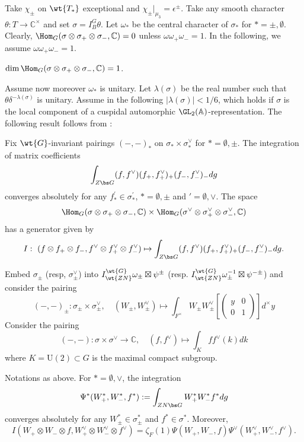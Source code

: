 \documentclass[11pt,reqno]{amsart}
\newcommand{\BA}{{\mathbb {A}}} \newcommand{\BB}{{\mathbb {B}}}
\newcommand{\BC}{{\mathbb {C}}} \newcommand{\BD}{{\mathbb {D}}}
\newcommand{\RU}{{\mathrm {U}}} \newcommand{\RV}{{\mathrm {V}}}
\newcommand{\lra}{\longrightarrow}\newcommand{\lla}{\longleftarrow}
\theoremstyle{plain}
\theoremstyle{remark} \newtheorem{remark}[thm]{Remark}
\theoremstyle{definition} \newtheorem{exercise}[thm]{Exercise}
\theoremstyle{definition} \newtheorem{example}[thm]{Example} \newtheorem{condition}[thm]{Condition}
\numberwithin{equation}{section}
\renewcommand{\-}{\text{--}}
\begin{document}
Take $\chi_{\pm}$ on $\wt{T_*}$ exceptional and $\chi_\pm|_{\mu_3}=\epsilon^\pm$. Take any smooth character $\theta: T\to\BC^\times$ and set $\sigma=I_B^G\theta$. Let $\omega_*$ be the central character of $\sigma_*$ for $*=\pm,\emptyset$. Clearly, $\Hom_G(\sigma\otimes\sigma_+\otimes\sigma_-,\BC)=0$ unless $\omega\omega_+\omega_-=1$. In the following, we assume $\omega\omega_+\omega_-=1$.
\begin{prop} $\dim \Hom_G(\sigma\otimes\sigma_+\otimes\sigma_-,\BC)=1$.
\end{prop}
Assume now moreover $\omega_*$ is unitary. Let $\lambda(\sigma)$ be the real number such that $\theta\delta^{-\lambda(\sigma)}$ is unitary. Assume in the following $|\lambda(\sigma)|<1/6$, which holds if $\sigma$ is the local component of a cuspidal automorphic $\GL_2(\BA)$-representation. The following result follows from \cite[Proposition 2.1]{Ich08}:
\begin{prop}\label{CanA}Fix  $\wt{G}$-invariant pairings $(-,-)_*$ on $\sigma_*\times\sigma_*^\vee$ for $*=\emptyset,\pm$. The integration of matrix coefficients 
\[\int_{Z\bs G}(f,f^\vee)(f_+,f_+^\vee)_+(f_-,f_-^\vee)_-dg\]
converges absolutely for any $f_*^\prime\in\sigma_*^\prime$, $*=\emptyset,\pm$ and $\prime=\emptyset,\vee$. The space \[\Hom_{G}(\sigma\otimes\sigma_+\otimes\sigma_-,\BC)\times \Hom_{G}(\sigma^\vee\otimes\sigma_+^\vee\otimes\sigma_-^\vee,\BC)\] has a generator given by 
\[I:\ (f\otimes f_+\otimes f_-,f^\vee\otimes f_+^\vee\otimes f_-^\vee)\mapsto \int_{Z\bs G}(f,f^\vee)(f_+,f_+^\vee)_+(f_-,f_-^\vee)_-dg.\]
\end{prop}
Embed  $\sigma_\pm$ (resp, $\sigma_\pm^\vee$) into $I_{\wt{ZN}}^{\wt{G}}\omega_{\pm}\boxtimes\psi^{\pm}$ (resp. $I_{\wt{ZN}}^{\wt{G}}\omega_{\pm}^{-1}\boxtimes\psi^{-\pm}$) and consider the pairing 
\[(-,-)_\pm: \sigma_\pm\times\sigma_\pm^\vee,\quad (W_\pm,W_\pm^\vee)\mapsto\int_{F^\times}W_\pm W_\pm^\vee\left[\begin{pmatrix}y & 0\\ 0 & 1\end{pmatrix}\right]d^\times y\]
Consider the pairing 
\[(-,-): \sigma\times\sigma^\vee\lra\BC, \quad (f,f^\vee)\mapsto\int_{K}ff^\vee(k)dk\]
where $K=\RU(2)\subset G$ is the maximal compact subgroup.
\begin{prop}\label{Tri-III}Notations as above. For $*=\emptyset,\vee$, the integration 
\[\Psi^*(W_+^*,W_-^*,f^*):=\int_{ZN\bs G}W_+^*W_-^*f^*dg\]
converges absolutely for any $W_\pm^*\in \sigma_\pm^*$ and $f^*\in\sigma^*$. Moreover, 
\[I(W_+\otimes W_-\otimes f, W_+^\vee\otimes W_-^\vee\otimes f^\vee)=\zeta_F(1)\Psi(W_+,W_-,f)\Psi^\vee(W_+^\vee,W_-^\vee,f^\vee).\]
\end{prop}
\end{document}
